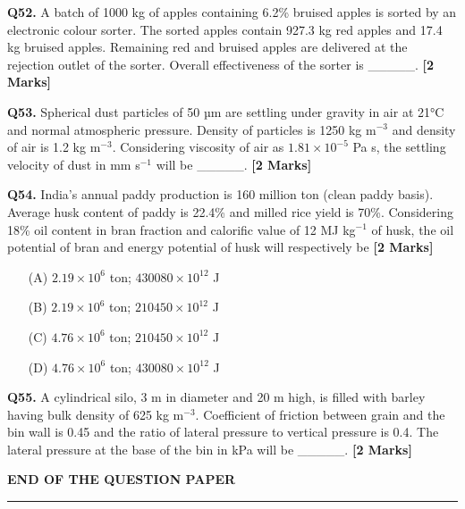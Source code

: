 \documentclass[11pt]{article}
\newcommand{\questionb}[2]{
    \noindent\textbf{Q#2.} #1 \hfill \textbf{[2 Marks]}
}
\begin{document}
\vspace{0.5cm}

\questionb{A batch of 1000 kg of apples containing 6.2\% bruised apples is sorted by an electronic colour sorter. The sorted apples contain 927.3 kg red apples and 17.4 kg bruised apples. Remaining red and bruised apples are delivered at the rejection outlet of the sorter. Overall effectiveness of the sorter is \_\_\_\_\_.}{52}

\vspace{0.5cm}

\questionb{Spherical dust particles of 50 µm are settling under gravity in air at 21°C and normal atmospheric pressure. Density of particles is 1250 kg m$^{-3}$ and density of air is 1.2 kg m$^{-3}$. Considering viscosity of air as $1.81 \times 10^{-5}$ Pa s, the settling velocity of dust in mm s$^{-1}$ will be \_\_\_\_\_.}{53}

\vspace{0.5cm}

\questionb{India's annual paddy production is 160 million ton (clean paddy basis). Average husk content of paddy is 22.4\% and milled rice yield is 70\%. Considering 18\% oil content in bran fraction and calorific value of 12 MJ kg$^{-1}$ of husk, the oil potential of bran and energy potential of husk will respectively be}{54}
\begin{enumerate}
    \item[(A)] $2.19 \times 10^6$ ton; $430080 \times 10^{12}$ J
    \item[(B)] $2.19 \times 10^6$ ton; $210450 \times 10^{12}$ J
    \item[(C)] $4.76 \times 10^6$ ton; $210450 \times 10^{12}$ J
    \item[(D)] $4.76 \times 10^6$ ton; $430080 \times 10^{12}$ J
\end{enumerate}

\vspace{0.5cm}

\questionb{A cylindrical silo, 3 m in diameter and 20 m high, is filled with barley having bulk density of 625 kg m$^{-3}$. Coefficient of friction between grain and the bin wall is 0.45 and the ratio of lateral pressure to vertical pressure is 0.4. The lateral pressure at the base of the bin in kPa will be \_\_\_\_\_.}{55}

\vspace{0.5cm}

\vspace{5cm}
\begin{center}
\textbf{END OF THE QUESTION PAPER}
\rule{\textwidth}{0.5pt} 
\end{center}
\end{document}
